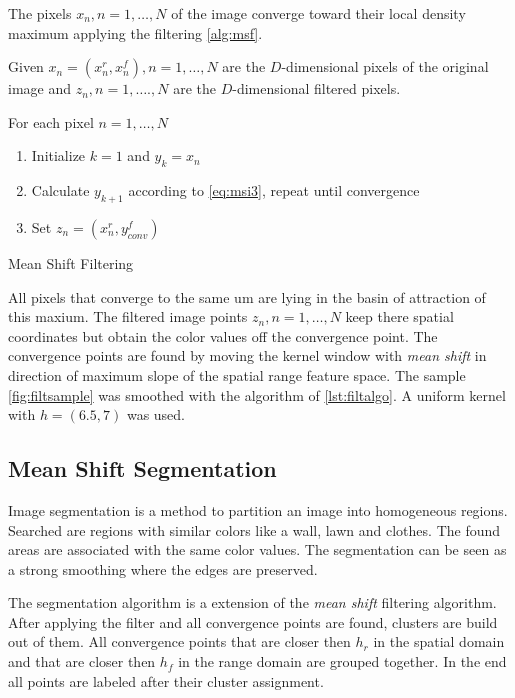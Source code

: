 The pixels $x_n, n = 1, \ldots, N$ of the image converge toward their local density
maximum applying the filtering  \autoref{alg:msf}. 

\begin{algorithm2e}[H]
Given $x_n = (x_n^r, x_n^f), n = 1, \ldots , N$ are the $D$-dimensional pixels
of the original image and $z_n, n = 1 , \ldots. , N$ are the $D$-dimensional
filtered pixels.

For each pixel $n = 1, \ldots , N$
\begin{enumerate}%
 \item Initialize $k = 1$ and $y_k = x_n$
 \item Calculate $y_{k+1}$ according to \autoref{eq:msi3}, repeat
until convergence
 \item Set $z_n = (x_n^r, y_{conv}^f)$
\end{enumerate}

\caption{Mean Shift Filtering}
\label{alg:msf}
\end{algorithm2e}


All pixels that converge to the same um are lying in the basin of attraction
of this maxium. The filtered image points $z_n, n = 1 , \ldots , N$ keep there
spatial coordinates but obtain the color values off the convergence point. The
convergence points are found by moving the kernel window with \emph{mean shift} 
in direction of maximum slope of the spatial range feature space. The sample
\autoref{fig:filtsample} was smoothed with the algorithm of \autoref{lst:filtalgo}. 
A uniform kernel with $h = (6.5, 7)$ was used.

\subsection{Mean Shift Segmentation} %
\label{sub:mean_shift_segmentation}
Image segmentation is a method to partition an image into homogeneous regions. 
Searched are regions with similar colors like a wall, lawn and clothes. 
The found areas are associated with the same color values. The segmentation 
can be seen as a strong smoothing where the edges are preserved. 

The segmentation algorithm is a extension of the \emph{mean shift } filtering
algorithm. After applying the filter and all convergence points are found,
clusters are build out of them. All convergence points that are closer then
$h_r$ in the spatial domain and that are closer then $h_f$ in the range domain
are grouped together. In the end all points are labeled after their cluster
assignment.

